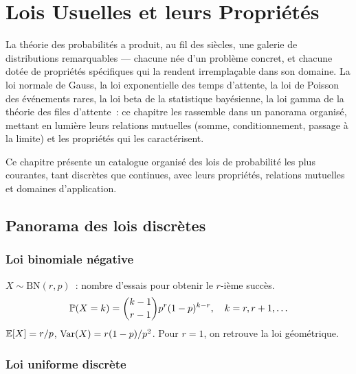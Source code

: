 \chapter{Lois Usuelles et leurs Propri\'et\'es}
\label{ch:lois}

La th\'eorie des probabilit\'es a produit, au fil des si\`ecles, une galerie de distributions remarquables --- chacune n\'ee d'un probl\`eme concret, et chacune dot\'ee de propri\'et\'es sp\'ecifiques qui la rendent irremplaçable dans son domaine. La loi normale de Gauss, la loi exponentielle des temps d'attente, la loi de Poisson des \'ev\'enements rares, la loi beta de la statistique bay\'esienne, la loi gamma de la th\'eorie des files d'attente~: ce chapitre les rassemble dans un panorama organis\'e, mettant en lumi\`ere leurs relations mutuelles (somme, conditionnement, passage \`a la limite) et les propri\'et\'es qui les caract\'erisent.

\begin{intuition}
Ce chapitre pr\'esente un catalogue organis\'e des lois de probabilit\'e les plus
courantes, tant discr\`etes que continues, avec leurs propri\'et\'es, relations
mutuelles et domaines d'application.
\end{intuition}

\section{Panorama des lois discr\`etes}

\subsection{Loi binomiale n\'egative}

\begin{definition}
$X \sim \text{BN}(r, p)$~: nombre d'essais pour obtenir le $r$-i\`eme succ\`es.
\[
    \mathbb{P}(X = k) = \binom{k-1}{r-1} p^r (1-p)^{k-r}, \quad k = r, r+1, \ldots
\]
$\mathbb{E}[X] = r/p$, $\mathrm{Var}(X) = r(1-p)/p^2$. Pour $r = 1$, on retrouve la loi g\'eom\'etrique.
\end{definition}

\subsection{Loi uniforme discr\`ete}

